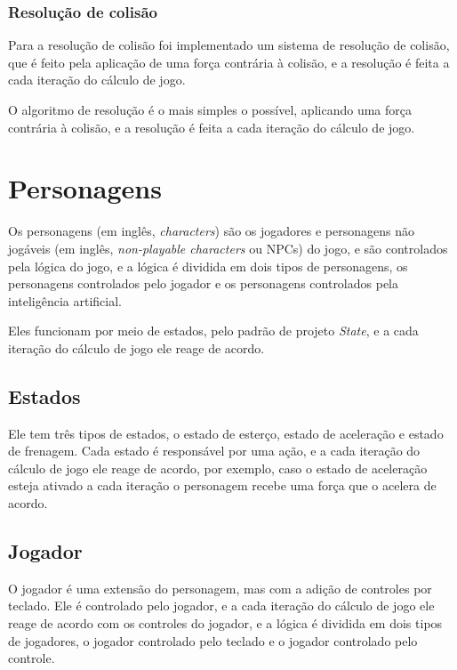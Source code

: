 \subsubsection{Resolução de colisão}

Para a resolução de colisão foi implementado um sistema de resolução de colisão, que é feito pela aplicação de uma força contrária à colisão, e a resolução é feita a cada iteração do cálculo de jogo.

O algoritmo de resolução é o mais simples o possível, aplicando uma força contrária à colisão, e a resolução é feita a cada iteração do cálculo de jogo.

\section{Personagens}

Os personagens (em inglês, \textit{characters}) são os jogadores e personagens não jogáveis (em inglês, \textit{non-playable characters} ou NPCs) do jogo, e são controlados pela lógica do jogo, e a lógica é dividida em dois tipos de personagens, os personagens controlados pelo jogador e os personagens controlados pela inteligência artificial.

Eles funcionam por meio de estados, pelo padrão de projeto \textit{State}, e a cada iteração do cálculo de jogo ele reage de acordo.

\subsection{Estados}

Ele tem três tipos de estados, o estado de esterço, estado de aceleração e estado de frenagem. Cada estado é responsável por uma ação, e a cada iteração do cálculo de jogo ele reage de acordo, por exemplo, caso o estado de aceleração esteja ativado a cada iteração o personagem recebe uma força que o acelera de acordo.

\subsection{Jogador}

O jogador é uma extensão do personagem, mas com a adição de controles por teclado. Ele é controlado pelo jogador, e a cada iteração do cálculo de jogo ele reage de acordo com os controles do jogador, e a lógica é dividida em dois tipos de jogadores, o jogador controlado pelo teclado e o jogador controlado pelo controle.

